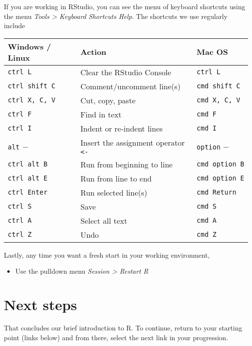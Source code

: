 \documentclass[
]{book}
\providecommand{\tightlist}{%
  \setlength{\itemsep}{0pt}\setlength{\parskip}{0pt}}
\begin{document}
If you are working in RStudio, you can see the menu of keyboard
shortcuts using the menu \emph{Tools \textgreater{} Keyboard Shortcuts Help}. The
shortcuts we use regularly include

\begin{longtable}[]{@{}lll@{}}
\toprule
Windows / Linux & Action & Mac OS \\
\midrule
\endhead
\texttt{ctrl\ L} & Clear the RStudio Console & \texttt{ctrl\ L} \\
\texttt{ctrl\ shift\ C} & Comment/uncomment line(s) & \texttt{cmd\ shift\ C} \\
\texttt{ctrl\ X,\ C,\ V} & Cut, copy, paste & \texttt{cmd\ X,\ C,\ V} \\
\texttt{ctrl\ F} & Find in text & \texttt{cmd\ F} \\
\texttt{ctrl\ I} & Indent or re-indent lines & \texttt{cmd\ I} \\
\texttt{alt} \(-\) & Insert the assignment operator \texttt{\textless{}-} & \texttt{option} \(-\) \\
\texttt{ctrl\ alt\ B} & Run from beginning to line & \texttt{cmd\ option\ B} \\
\texttt{ctrl\ alt\ E} & Run from line to end & \texttt{cmd\ option\ E} \\
\texttt{ctrl\ Enter} & Run selected line(s) & \texttt{cmd\ Return} \\
\texttt{ctrl\ S} & Save & \texttt{cmd\ S} \\
\texttt{ctrl\ A} & Select all text & \texttt{cmd\ A} \\
\texttt{ctrl\ Z} & Undo & \texttt{cmd\ Z} \\
\bottomrule
\end{longtable}

Lastly, any time you want a fresh start in your working environment,

\begin{itemize}
\tightlist
\item
  Use the pulldown menu \emph{Session \textgreater{} Restart R}
\end{itemize}

\hypertarget{next-steps}{%
\section{Next steps}\label{next-steps}}

That concludes our brief introduction to R. To continue, return to your starting point (links below) and from there, select the next link in your progression.
\end{document}
